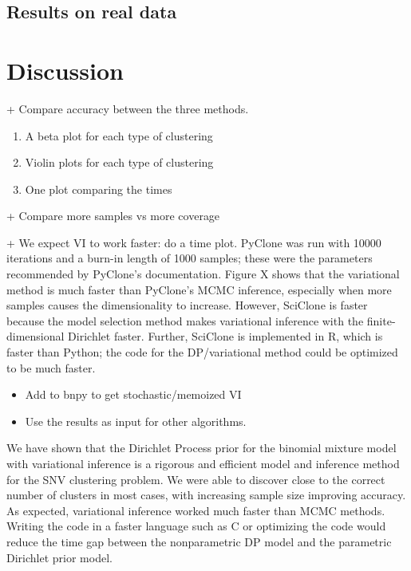 \documentclass[11pt]{article}
\begin{document}
\subsection{Results on real data}

\section{Discussion}
+ Compare accuracy between the three methods.

\begin{enumerate}
\item A beta plot for each type of clustering
\item Violin plots for each type of clustering 
\item One plot comparing the times
\end{enumerate}

+ Compare more samples vs more coverage

+ We expect VI to work faster: do a time plot. PyClone was run with 10000 iterations and a burn-in length of 1000 samples; these were the parameters recommended by PyClone's documentation. Figure X shows that the variational method is much faster than PyClone's MCMC inference, especially when more samples causes the dimensionality to increase. However, SciClone is faster because the model selection method makes variational inference with the finite-dimensional Dirichlet faster. Further, SciClone is implemented in R, which is faster than Python; the code for the DP/variational method could be optimized to be much faster.

\begin{itemize}
	\item Add to bnpy to get stochastic/memoized VI
	\item Use the results as input for other algorithms.
\end{itemize}

We have shown that the Dirichlet Process prior for the binomial mixture model with variational inference is a rigorous and efficient model and inference method for the SNV clustering problem. We were able to discover close to the correct number of clusters in most cases, with increasing sample size improving accuracy. As expected, variational inference worked much faster than MCMC methods. Writing the code in a faster language such as C or optimizing the code would  reduce the time gap between the nonparametric DP model and the parametric Dirichlet prior model.
\end{document}
